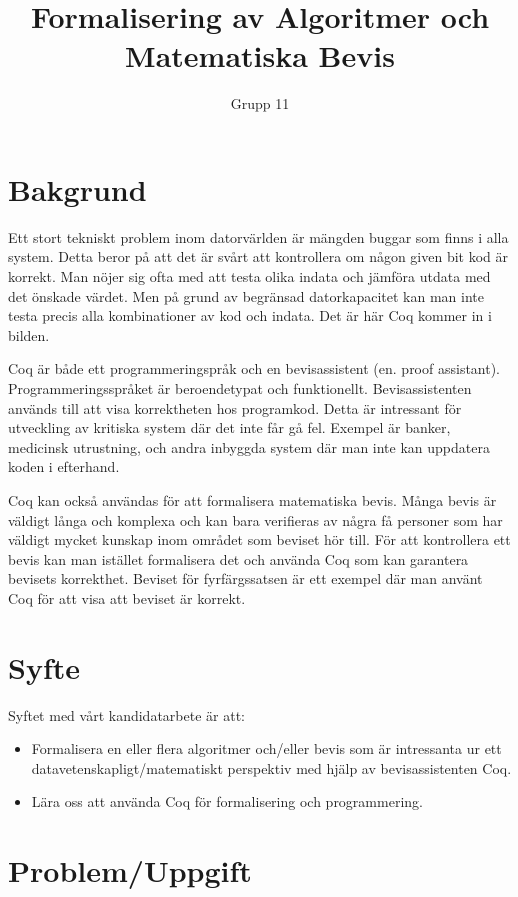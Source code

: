 \documentclass[a4paper]{article}
\author{Grupp 11}
\title{Formalisering av Algoritmer och Matematiska Bevis}
\begin{document}
\maketitle
\thispagestyle{empty}
\newpage

\section*{Bakgrund}

Ett stort tekniskt problem inom datorvärlden är mängden buggar som finns i alla
system. Detta beror på att det är svårt att kontrollera om någon given bit kod
är korrekt. Man nöjer sig ofta med att testa olika indata och jämföra utdata
med det önskade värdet. Men på grund av begränsad datorkapacitet kan man inte
testa precis alla kombinationer av kod och indata. Det är här Coq kommer in i
bilden.

Coq är både ett programmeringspråk och en bevisassistent (en. proof assistant).
Programmeringsspråket är beroendetypat och funktionellt. Bevisassistenten
används till att visa korrektheten hos programkod. Detta är intressant för
utveckling av kritiska system där det inte får gå fel. Exempel är banker,
medicinsk utrustning, och andra inbyggda system där man inte kan uppdatera
koden i efterhand.

Coq kan också användas för att formalisera matematiska bevis. Många bevis är
väldigt långa och komplexa och kan bara verifieras av några få personer som har
väldigt mycket kunskap inom området som beviset hör till. För att kontrollera
ett bevis kan man istället formalisera det och använda Coq som kan garantera
bevisets korrekthet. Beviset för fyrfärgssatsen är ett exempel där man använt
Coq för att visa att beviset är korrekt.

\section*{Syfte}

Syftet med vårt kandidatarbete är att:

\begin{itemize}
  \item Formalisera en eller flera algoritmer och/eller bevis som är
    intressanta ur ett datavetenskapligt/matematiskt perspektiv med hjälp av
    bevisassistenten Coq.
  \item Lära oss att använda Coq för formalisering och programmering.
\end{itemize}

\section*{Problem/Uppgift}
\end{document}
